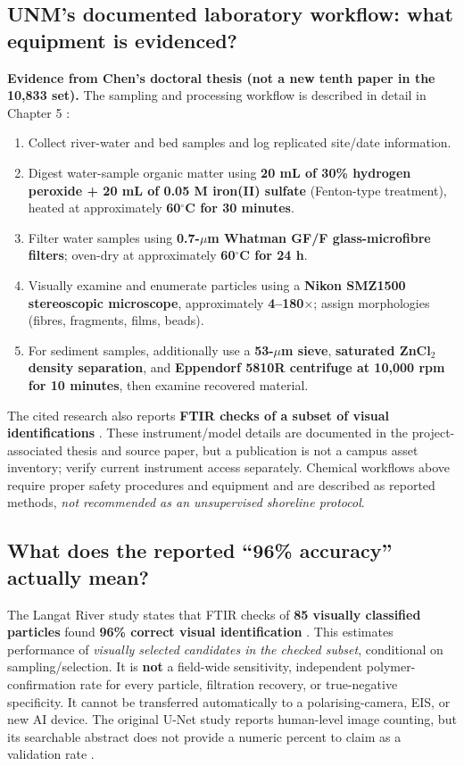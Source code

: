 \documentclass[10pt,a4paper]{article}
\begin{document}
\subsection{UNM's documented laboratory workflow: what equipment is evidenced?}
\textbf{Evidence from Chen's doctoral thesis (not a new tenth paper in the 10,833 set).} The sampling and processing workflow is described in detail in Chapter 5 \cite{ChenThesis2023}:
\begin{enumerate}
 \item Collect river-water and bed samples and log replicated site/date information.
 \item Digest water-sample organic matter using \textbf{20 mL of 30\% hydrogen peroxide + 20 mL of 0.05 M iron(II) sulfate} (Fenton-type treatment), heated at approximately \textbf{60$^\circ$C for 30 minutes}.
 \item Filter water samples using \textbf{0.7-$\mu$m Whatman GF/F glass-microfibre filters}; oven-dry at approximately \textbf{60$^\circ$C for 24 h}.
 \item Visually examine and enumerate particles using a \textbf{Nikon SMZ1500 stereoscopic microscope}, approximately \textbf{4--180$\times$}; assign morphologies (fibres, fragments, films, beads).
 \item For sediment samples, additionally use a \textbf{53-$\mu$m sieve}, \textbf{saturated ZnCl$_2$ density separation}, and \textbf{Eppendorf 5810R centrifuge at 10,000 rpm for 10 minutes}, then examine recovered material.
\end{enumerate}
The cited research also reports \textbf{FTIR checks of a subset of visual identifications} \cite{Corpus20}. These instrument/model details are documented in the project-associated thesis and source paper, but a publication is not a campus asset inventory; verify current instrument access separately. Chemical workflows above require proper safety procedures and equipment and are described as reported methods, \emph{not recommended as an unsupervised shoreline protocol}.

\subsection{What does the reported ``96\% accuracy'' actually mean?}
The Langat River study states that FTIR checks of \textbf{85 visually classified particles} found \textbf{96\% correct visual identification} \cite{Corpus20}. This estimates performance of \emph{visually selected candidates in the checked subset}, conditional on sampling/selection. It is \textbf{not} a field-wide sensitivity, independent polymer-confirmation rate for every particle, filtration recovery, or true-negative specificity. It cannot be transferred automatically to a polarising-camera, EIS, or new AI device. The original U-Net study reports human-level image counting, but its searchable abstract does not provide a numeric percent to claim as a validation rate \cite{Corpus23}.
\end{document}

